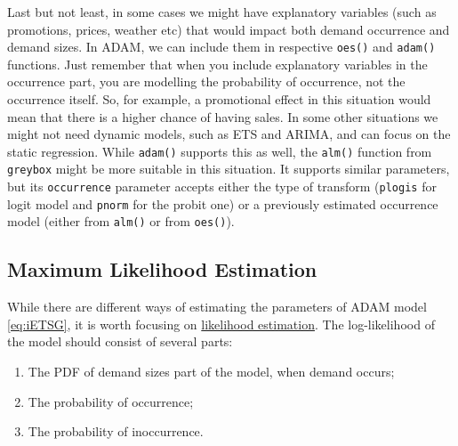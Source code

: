 \documentclass[
]{book}
\providecommand{\tightlist}{%
  \setlength{\itemsep}{0pt}\setlength{\parskip}{0pt}}
\theoremstyle{definition}
\theoremstyle{definition}
\theoremstyle{definition}
\theoremstyle{definition}
\theoremstyle{remark}
\begin{document}
Last but not least, in some cases we might have explanatory variables (such as promotions, prices, weather etc) that would impact both demand occurrence and demand sizes. In ADAM, we can include them in respective \texttt{oes()} and \texttt{adam()} functions. Just remember that when you include explanatory variables in the occurrence part, you are modelling the probability of occurrence, not the occurrence itself. So, for example, a promotional effect in this situation would mean that there is a higher chance of having sales. In some other situations we might not need dynamic models, such as ETS and ARIMA, and can focus on the static regression. While \texttt{adam()} supports this as well, the \texttt{alm()} function from \texttt{greybox} might be more suitable in this situation. It supports similar parameters, but its \texttt{occurrence} parameter accepts either the type of transform (\texttt{plogis} for logit model and \texttt{pnorm} for the probit one) or a previously estimated occurrence model (either from \texttt{alm()} or from \texttt{oes()}).

\hypertarget{iETSMLE}{%
\subsection{Maximum Likelihood Estimation}\label{iETSMLE}}

While there are different ways of estimating the parameters of ADAM model \eqref{eq:iETSG}, it is worth focusing on \protect\hyperlink{likelihoodApproach}{likelihood estimation}. The log-likelihood of the model should consist of several parts:

\begin{enumerate}
\def\labelenumi{\arabic{enumi}.}
\tightlist
\item
  The PDF of demand sizes part of the model, when demand occurs;
\item
  The probability of occurrence;
\item
  The probability of inoccurrence.
\end{enumerate}
\end{document}
